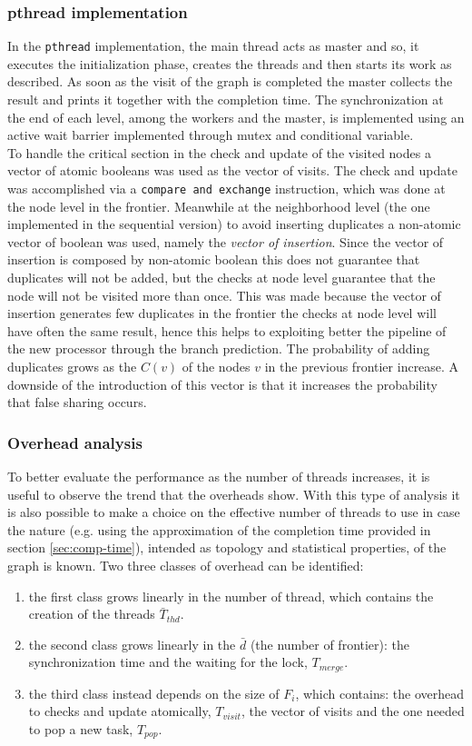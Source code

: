 \subsubsection{pthread implementation}
In the \texttt{pthread} implementation, the main thread acts as master and so, 
it executes the initialization phase, creates 
the threads and then starts its work as described. As soon as the visit of the graph
is completed the master collects the result and prints it together with the completion time. The synchronization at the end of each level, among the workers and the master, 
is implemented using an active wait barrier implemented through mutex and conditional variable.
\\
To handle the critical section in the check and update of the visited nodes a vector of atomic booleans was used as the vector of visits. The check and update was accomplished via a \texttt{compare and exchange} instruction, which was done at the node level in the frontier. Meanwhile at the neighborhood level (the one implemented in the sequential version) to avoid inserting duplicates a non-atomic vector of boolean was used, namely the \textit{vector of insertion}. Since the vector of insertion is composed by non-atomic boolean this does not guarantee that duplicates will not be added, but the checks at node level guarantee that the node will not be visited more than once. This was made because the vector of insertion generates few duplicates in the frontier the checks at node level will have often the same result, hence this helps to exploiting better the pipeline of the new processor through the branch prediction. The probability of adding duplicates grows as the $C(v)$ of the nodes $v$ in the previous frontier increase. A downside of the introduction of this vector is that it increases the probability that false sharing occurs. 
\subsubsection{Overhead analysis}
\label{sec:overhead}
To better evaluate the performance as the number of threads increases, it is useful to observe the trend that the overheads show. With this type of analysis it is also possible to make a choice on the effective number of threads to use in case the nature (e.g. using the approximation of the completion time provided in section \ref{sec:comp-time}), intended as topology and statistical properties, of the graph is known. Two three classes of overhead can be identified: 
\begin{enumerate} 
    \item the first class grows linearly in the number of thread, which contains the creation of the threads $\bar{T}_{thd}$.
    \item the second class grows linearly in the $\bar{d}$ (the number of frontier): the synchronization time and the waiting for the lock, $T_{merge}$.
    \item the third class instead depends on the size of $F_i$, which contains: the overhead to checks and update atomically, $T_{visit}$, the vector of visits and the one needed to pop a new task, $T_{pop}$.
\end{enumerate}

